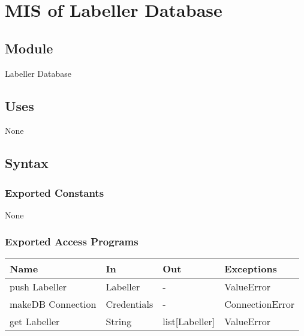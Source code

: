 \documentclass[12pt, titlepage]{article}
\begin{document}

\section{MIS of Labeller Database }\label{Labeller database}
  
  
  
  \subsection{Module}
  
  Labeller Database
  
  \subsection{Uses}
  
  None
  
  \subsection{Syntax}


  
  \subsubsection{Exported Constants}
  None
  \subsubsection{Exported Access Programs}
  
  \begin{center}
  \begin{tabular}{p{2cm} p{4cm} p{4cm} p{2cm}}
  \hline
  \textbf{Name} & \textbf{In} & \textbf{Out} & \textbf{Exceptions} \\
  \hline
  push Labeller & Labeller & - & ValueError \\
  \hline
  makeDB Connection & Credentials & - &  ConnectionError\\
  \hline
  get Labeller & String & list[Labeller] & ValueError \\
  \hline
  \end{tabular}
  \end{center}
  
\end{document}
